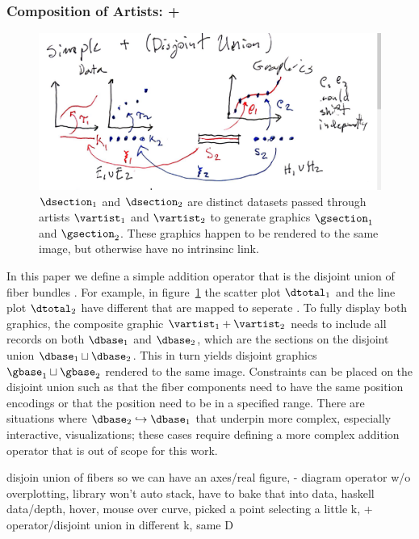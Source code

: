 \documentclass[../main.tex]{subfiles}
\begin{document}
\subsubsection{Composition of Artists: +}
\begin{figure}
    \includegraphics[width=1\textwidth]{figures/math/addition_operator.png}
    \caption{$\dsection_1$ and $\dsection_2$ are distinct datasets passed through artists $\vartist_1$ and $\vartist_2$ to generate graphics $\gsection_1$ and $\gsection_2$. These graphics happen to be rendered to the same image, but otherwise have no intrinsinc link.}
    \label{fig:artist_plus}
\end{figure}
In this paper we define a simple addition operator that is the disjoint union of fiber bundles \dtotal.  For example, in figure~\ref{fig:artist_plus} the scatter plot $\dtotal_1$ and the line plot $\dtotal_2$ have different \dbase that are mapped to seperate \gbase. To fully display both graphics, the composite graphic $\vartist_1 + \vartist_2$ needs to include all records on both $\dbase_1$ and $\dbase_2$, which are the sections on the disjoint union $\dbase_1 \sqcup \dbase_2$. This in turn yields disjoint graphics $\gbase_1 \sqcup \gbase_2$ rendered to the same image. Constraints can be placed on the disjoint union such as that the fiber components need to have the same \vchannel position encodings or that the position \vsection need to be in a specified range. There are situations where $\dbase_2 \hookrightarrow \dbase_1$ that underpin more complex, especially interactive, visualizations; these cases require defining a more complex addition operator that is out of scope for this work. 



disjoin union of fibers so we can have an axes/real figure, - diagram operator w/o overplotting, library won't auto stack, have to bake that into data, haskell data/depth, 
hover, mouse over curve, picked a point selecting a little k, + operator/disjoint union in different k, same D
\end{document}
